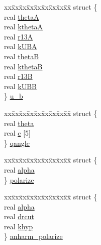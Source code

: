 \begin{DoxyCompactItemize}
\begin{tabbing}
\end{tabbing}\item 
\begin{tabbing}
xx\=xx\=xx\=xx\=xx\=xx\=xx\=xx\=xx\=\kill
struct \{\\
\>real \hyperlink{uniont__iparams_ab8bb8747fb121e0cb9d745f65da9ea5e}{thetaA}\\
\>real \hyperlink{uniont__iparams_a6e798cc22000d961f109d5bb800141a7}{kthetaA}\\
\>real \hyperlink{uniont__iparams_af3be3c381f7a93d998b65f63e6b1490c}{r13A}\\
\>real \hyperlink{uniont__iparams_ada121915ef9c65998d87f4f3fedf63f0}{kUBA}\\
\>real \hyperlink{uniont__iparams_a829cbdd7ca469bd94e404aec2e99b73b}{thetaB}\\
\>real \hyperlink{uniont__iparams_abb5f2c9324ba3feda84b0934df1230c7}{kthetaB}\\
\>real \hyperlink{uniont__iparams_aee9a9e5ef09acc62054a8053f981b8a1}{r13B}\\
\>real \hyperlink{uniont__iparams_a05c8854b2e571d50abe4bd9862b9f985}{kUBB}\\
\} \hyperlink{uniont__iparams_a091aebee055a1d0fa9ceb3321e3cf59a}{u\_b}\\

\end{tabbing}\item 
\begin{tabbing}
xx\=xx\=xx\=xx\=xx\=xx\=xx\=xx\=xx\=\kill
struct \{\\
\>real \hyperlink{uniont__iparams_a87d29a37003ac66af358bf2d56c28dd7}{theta}\\
\>real \hyperlink{uniont__iparams_a6f12f82807f6b417c8982bbb5a27af83}{c} \mbox{[}5\mbox{]}\\
\} \hyperlink{uniont__iparams_a39855f5e6dc3fcbcb5fd0ac64e56acb3}{qangle}\\

\end{tabbing}\item 
\begin{tabbing}
xx\=xx\=xx\=xx\=xx\=xx\=xx\=xx\=xx\=\kill
struct \{\\
\>real \hyperlink{uniont__iparams_a1ba2fc2db2b806987876aa29c1702db4}{alpha}\\
\} \hyperlink{uniont__iparams_a966dce8f31786679b3f70d76b05d1ede}{polarize}\\

\end{tabbing}\item 
\begin{tabbing}
xx\=xx\=xx\=xx\=xx\=xx\=xx\=xx\=xx\=\kill
struct \{\\
\>real \hyperlink{uniont__iparams_a1ba2fc2db2b806987876aa29c1702db4}{alpha}\\
\>real \hyperlink{uniont__iparams_aafbc5702044534aeaa91cbb68600c9aa}{drcut}\\
\>real \hyperlink{uniont__iparams_a46523e73f4861b4ebdb88df69804b3ae}{khyp}\\
\} \hyperlink{uniont__iparams_adb8397e3d4bd3274fe8d505b04b035a6}{anharm\_polarize}\\


\end{tabbing}
\end{DoxyCompactItemize}
